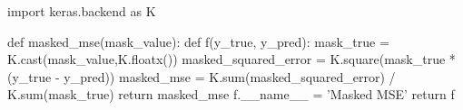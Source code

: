 import keras.backend as K

def masked_mse(mask_value):
    def f(y_true, y_pred):
        mask_true = K.cast(mask_value,K.floatx())
        masked_squared_error = K.square(mask_true *(y_true - y_pred))
        masked_mse = K.sum(masked_squared_error) / K.sum(mask_true)
        return masked_mse
    f.__name__ = 'Masked MSE'
    return f